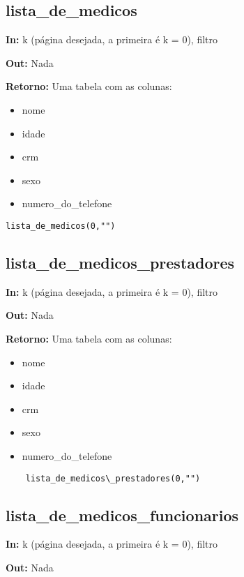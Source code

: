 \subsection{lista\_de\_medicos}

\textbf{In:} k (página desejada, a primeira é k = 0), filtro

\textbf{Out:} Nada

\textbf{Retorno:} Uma tabela com as colunas:

\begin{itemize}
	\item nome
	\item idade
	\item crm
	\item sexo
	\item numero\_do\_telefone
\end{itemize}

\begin{verbatim}
lista_de_medicos(0,"")
\end{verbatim}

\subsection{lista\_de\_medicos\_prestadores}

\textbf{In:} k (página desejada, a primeira é k = 0), filtro

\textbf{Out:} Nada

\textbf{Retorno:} Uma tabela com as colunas:

\begin{itemize}
	\item nome
	\item idade
	\item crm
	\item sexo
	\item numero\_do\_telefone
\end{itemize}

\begin{verbatim}
	lista_de_medicos\_prestadores(0,"")
\end{verbatim}

\subsection{lista\_de\_medicos\_funcionarios}

\textbf{In:} k (página desejada, a primeira é k = 0), filtro

\textbf{Out:} Nada

